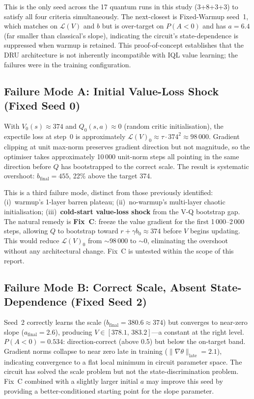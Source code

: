 \documentclass[10pt,a4paper]{article}
\begin{document}
This is the only seed across the 17 quantum runs in this study (3+8+3+3) to
satisfy all four criteria simultaneously.
The next-closest is Fixed-Warmup seed~1, which matches on $\mathcal{L}(V)$
and $b$ but is over-target on $P(A{<}0)$ and has $a=6.4$ (far smaller than
classical's slope), indicating the circuit's state-dependence is suppressed
when warmup is retained.
This proof-of-concept establishes that the DRU architecture is not inherently
incompatible with IQL value learning; the failures were in the training
configuration.

\subsection{Failure Mode A: Initial Value-Loss Shock (Fixed Seed 0)}

With $V_0(s)\approx374$ and $Q_0(s,a)\approx0$ (random critic initialisation),
the expectile loss at step~0 is approximately
$\mathcal{L}(V)_0 \approx \tau\cdot374^2\approx98\,000$.
Gradient clipping at unit max-norm preserves gradient direction but not
magnitude, so the optimiser takes approximately 10\,000 unit-norm steps all
pointing in the same direction before $Q$ has bootstrapped to the correct
scale. The result is systematic overshoot: $b_\text{final}=455$, 22\% above
the target 374.

This is a third failure mode, distinct from those previously identified:
(i)~warmup's 1-layer barren plateau; (ii)~no-warmup's multi-layer chaotic
initialisation; (iii)~\textbf{cold-start value-loss shock} from the V-Q
bootstrap gap.
The natural remedy is \textbf{Fix~C}: freeze the value gradient for the first
1\,000--2\,000 steps, allowing $Q$ to bootstrap toward
$r+\gamma b_0\approx374$ before $V$ begins updating. This would reduce
$\mathcal{L}(V)_0$ from $\sim$98\,000 to $\sim$0, eliminating the overshoot
without any architectural change.
Fix~C is untested within the scope of this report.

\subsection{Failure Mode B: Correct Scale, Absent State-Dependence
            (Fixed Seed 2)}

Seed~2 correctly learns the scale ($b_\text{final}=380.6\approx374$) but
converges to near-zero slope ($a_\text{final}=2.6$), producing
$V\in[378.1,\,383.2]$---a constant at the right level.
$P(A{<}0)=0.534$: direction-correct (above 0.5) but below the on-target band.
Gradient norms collapse to near zero late in training
($\|\nabla\theta\|_\text{late}=2.1$), indicating convergence to a flat local
minimum in circuit parameter space.
The circuit has solved the scale problem but not the state-discrimination
problem.
Fix~C combined with a slightly larger initial $a$ may improve this seed by
providing a better-conditioned starting point for the slope parameter.
\end{document}

